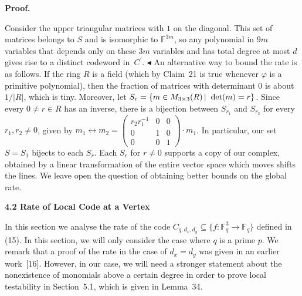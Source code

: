 


\par\medskip\noindent\textbf{Proof.}\par




Consider the upper triangular matrices with $1$ on the diagonal. This set of matrices belongs to $S$ and is isomorphic to $\mathbb{F}^{3m}$, so any polynomial in $9m$ variables that depends only on these $3m$ variables and has total degree at most $d$ gives rise to a distinct codeword in $C^{\prime}$.
$\blacktriangleleft$
An alternative way to bound the rate is as follows. If the ring $R$ is a field (which by Claim 21 is true whenever $\varphi$ is a primitive polynomial), then the fraction of matrices with determinant $0$ is about $1/|R|$, which is tiny. Moreover, let
$S_{r}=\left\{m\in M_{3\times 3}(R)\left|\;\vphantom{m\in M_{3\times 3}(R)\det(m)=r}\right.\det(m)=r\right\}$.
Since every $0\neq r\in R$ has an inverse, there is a bijection between $S_{r_{1}}$ and $S_{r_{2}}$ for every $r_{1},r_{2}\neq 0$, given by $m_{1}\leftrightarrow m_{2}=\begin{pmatrix}r_{2}r_{1}^{-1}&0&0\\
0&1&0\\
0&0&1\end{pmatrix}\cdot m_{1}$. In particular, our set $S=S_{1}$ bijects to each $S_{r}$.
Each $S_{r}$ for $r\neq 0$ supports a copy of our complex, obtained by a linear transformation of the entire vector space which moves shifts the lines.
We leave open the question of obtaining better bounds on the global rate.\par






\par\medskip\noindent\textbf{
4.2 Rate of Local Code at a Vertex}\par




In this section we analyse the rate of the code $C_{q,d_{x},d_{y}}\subseteq\{f:\mathbb{F}_{q}^{3}\to\mathbb{F}_{q}\}$ defined in (15). In this section, we will only consider the case where $q$ is a prime $p$. We remark that a proof of the rate in the case of $d_{x}=d_{y}$ was given in an earlier work [16]. However, in our case, we will need a stronger statement about the nonexistence of monomials above a certain degree in order to prove local testability in Section 5.1, which is given in Lemma 34.\par




